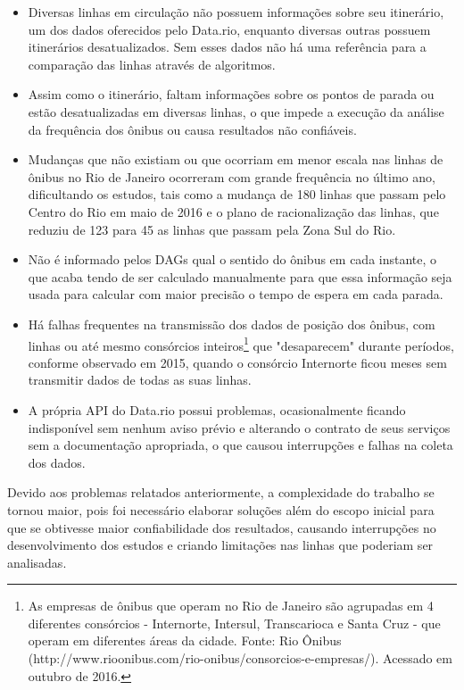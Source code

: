 \begin{itemize}
    \item Diversas linhas em circulação não possuem informações sobre seu itinerário, um dos dados oferecidos pelo Data.rio, enquanto diversas outras possuem itinerários desatualizados. Sem esses dados não há uma referência para a comparação das linhas através de algoritmos.
    \item Assim como o itinerário, faltam informações sobre os pontos de parada ou estão desatualizadas em diversas linhas, o que impede a execução da análise da frequência dos ônibus ou causa resultados não confiáveis.
    \item Mudanças que não existiam ou que ocorriam em menor escala nas linhas de ônibus no Rio de Janeiro ocorreram com grande frequência no último ano, dificultando os estudos, tais como a mudança de 180 linhas que passam pelo Centro do Rio em maio de 2016\cite{noticia_centro_mudancas} e o plano de racionalização das linhas, que reduziu de 123 para 45 as linhas que passam pela Zona Sul do Rio\cite{noticia_racionalizacao}.
    \item Não é informado pelos DAGs qual o sentido do ônibus em cada instante, o que acaba tendo de ser calculado manualmente para que essa informação seja usada para calcular com maior precisão o tempo de espera em cada parada.
    \item Há falhas frequentes na transmissão dos dados de posição dos ônibus, com linhas ou até mesmo consórcios inteiros\footnote{As empresas de ônibus que operam no Rio de Janeiro são agrupadas em 4 diferentes consórcios - Internorte, Intersul, Transcarioca e Santa Cruz - que operam em diferentes áreas da cidade. Fonte: Rio Ônibus (http://www.rioonibus.com/rio-onibus/consorcios-e-empresas/). Acessado em outubro de 2016.} que "desaparecem" \textit{} durante períodos, conforme observado em 2015, quando o consórcio Internorte ficou meses sem transmitir dados de todas as suas linhas.
    \item A própria API do Data.rio possui problemas, ocasionalmente ficando indisponível sem nenhum aviso prévio e alterando o contrato de seus serviços sem a documentação apropriada, o que causou interrupções e falhas na coleta dos dados.
\end{itemize}

Devido aos problemas relatados anteriormente, a complexidade do trabalho se tornou maior, pois foi necessário elaborar soluções além do escopo inicial para que se obtivesse maior confiabilidade dos resultados, causando interrupções no desenvolvimento dos estudos e criando limitações nas linhas que poderiam ser analisadas.

